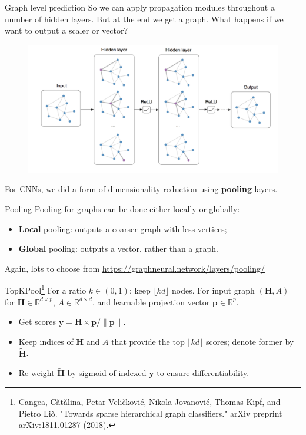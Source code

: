 \documentclass{beamer}
\begin{document}
\begin{frame}{Graph level prediction}
So we can apply propagation modules throughout a number of hidden layers. But at the end we get a graph. What happens if we want to output a scaler or vector?
\begin{figure}
\includegraphics[width=0.8\linewidth]{Images/GNN_structure.png}
\end{figure}
For CNNs, we did a form of dimensionality-reduction using \textbf{pooling} layers.
\end{frame}
\begin{frame}{Pooling}
Pooling for graphs can be done either locally or globally:
\begin{itemize}
\item \textbf{Local} pooling: outputs a coarser graph with less vertices;
\item \textbf{Global} pooling: outputs a vector, rather than a graph.
\end{itemize}
Again, lots to choose from \url{https://graphneural.network/layers/pooling/}
\end{frame}
\begin{frame}{TopKPool\footnote{Cangea, Cătălina, Petar Veličković, Nikola Jovanović, Thomas Kipf, and Pietro Liò. "Towards sparse hierarchical graph classifiers." arXiv preprint arXiv:1811.01287 (2018).}}
For a ratio $k\in(0,1)$; keep $\lfloor{kd}\rfloor$ nodes. For input graph $(\mathbf{H},A)$ for $\mathbf{H}\in\mathbb{R}^{d\times p}$, $A\in\mathbb{R}^{d\times d}$, and learnable projection vector $\mathbf{p}\in\mathbb{R}^p$. 
\begin{itemize}
\item Get scores $\mathbf{y}=\mathbf{H}\times\mathbf{p}/\|\mathbf{p}\|$.
\item  Keep indices of $\mathbf{H}$ and $A$ that provide the top $\lfloor{kd}\rfloor$ scores; denote former by $\tilde{\mathbf{H}}$.
\item  Re-weight $\tilde{\mathbf{H}}$ by sigmoid of indexed $\mathbf{y}$ to ensure differentiability.
\end{itemize}

\end{frame}
\end{document}
